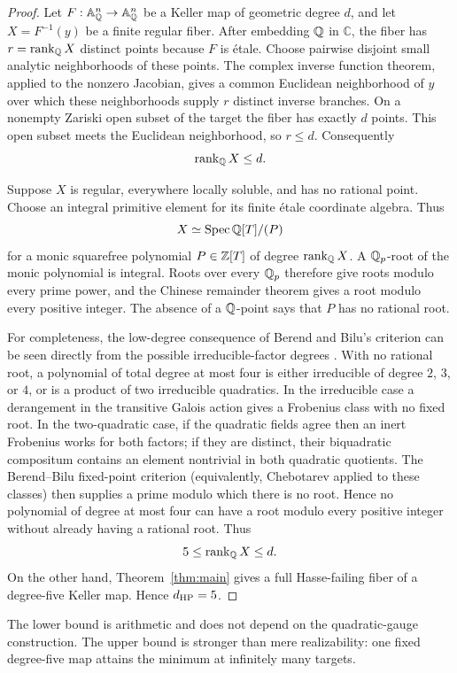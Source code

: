 \begin{proof}
Let \(F:\mathbb A^n_{\mathbb Q}\to\mathbb A^n_{\mathbb Q}\) be a Keller map of geometric degree \(d\),
and let \(X=F^{-1}(y)\) be a finite regular fiber. After embedding
\(\mathbb Q\) in \(\mathbb C\), the fiber has
\(r=\operatorname{rank}_{\mathbb Q}X\) distinct points because \(F\) is \'etale.
Choose pairwise disjoint small analytic neighborhoods of these points.
The complex inverse function theorem, applied to the nonzero Jacobian,
gives a common Euclidean neighborhood of \(y\) over which these
neighborhoods supply \(r\) distinct inverse branches. On a nonempty
Zariski open subset of the target the fiber has exactly \(d\) points.
This open subset meets the Euclidean neighborhood, so \(r\le d\).
Consequently
\begin{equation}
 \operatorname{rank}_{\mathbb Q}X\le d.
\end{equation}

Suppose \(X\) is regular, everywhere locally soluble, and has no rational
point.  Choose an integral primitive element for its finite \'etale
coordinate algebra.  Thus
\begin{equation}
 X\simeq\operatorname{Spec}\mathbb Q[T]/(P)
\end{equation}
for a monic squarefree polynomial \(P\in\mathbb Z[T]\) of degree
\(\operatorname{rank}_{\mathbb Q}X\).  A \(\mathbb Q_p\)-root of the monic polynomial is
integral.  Roots over every \(\mathbb Q_p\) therefore give roots modulo every prime
power, and the Chinese remainder theorem gives a root modulo every positive
integer.  The absence of a \(\mathbb Q\)-point says that \(P\) has no rational
root.

For completeness, the low-degree consequence of Berend and Bilu's
criterion can be seen directly from the possible irreducible-factor
degrees \cite{BerendBilu}.  With no rational root, a polynomial of total
degree at most four is either irreducible of degree \(2\), \(3\), or \(4\),
or is a product of two irreducible quadratics.  In the irreducible case a
derangement in the transitive Galois action gives a Frobenius class with no
fixed root.  In the two-quadratic case, if the quadratic fields agree then
an inert Frobenius works for both factors; if they are distinct, their
biquadratic compositum contains an element nontrivial in both quadratic
quotients.  The Berend--Bilu fixed-point criterion (equivalently,
Chebotarev applied to these classes) then supplies a prime modulo which
there is no root.  Hence no polynomial of degree at most four can have a
root modulo every positive integer without already having a rational root.
Thus
\begin{equation}
 5\le\operatorname{rank}_{\mathbb Q}X\le d.
\end{equation}
On the other hand, Theorem~\ref{thm:main} gives a full Hasse-failing fiber
of a degree-five Keller map.  Hence \(d_{\mathrm{HP}}=5\).
\end{proof}

\begin{remark}
The lower bound is arithmetic and does not depend on the quadratic-gauge
construction.  The upper bound is stronger than mere realizability: one
fixed degree-five map attains the minimum at infinitely many targets.
\end{remark}
